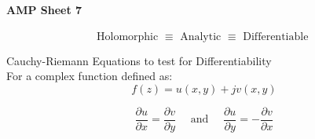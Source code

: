 \documentclass{article}
\author{Alex Hiller}
\title{}
\begin{document}
\paragraph{AMP Sheet 7}

$$
\text{Holomorphic } \equiv \text{ Analytic } \equiv \text{ Differentiable }
$$

Cauchy-Riemann Equations to test for Differentiability \\ For a complex function defined as:
$$
f(z) = u(x,y) + j v(x,y)
$$

$$
\frac{\partial u}{\partial x} = \frac{\partial v}{\partial y} 
\quad \text{ and } \quad
\frac{\partial u}{\partial y} = - \frac{\partial v}{\partial x}
$$
\end{document}
